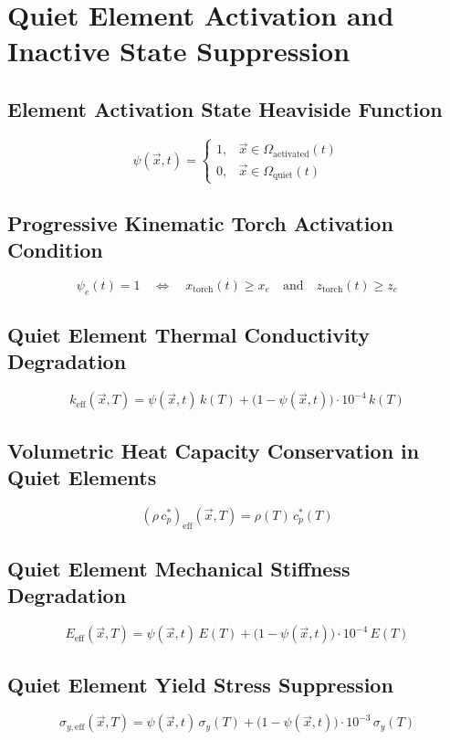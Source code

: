 \documentclass[10pt,a4paper]{article}
\begin{document}
\clearpage
\section{Quiet Element Activation and Inactive State Suppression}

\subsection*{Element Activation State Heaviside Function}
\[
\psi(\vec{x}, t) = \begin{cases}
1, & \vec{x} \in \Omega_{\mathrm{activated}}(t) \\
0, & \vec{x} \in \Omega_{\mathrm{quiet}}(t)
\end{cases}
\]

\subsection*{Progressive Kinematic Torch Activation Condition}
\[
\psi_e(t) = 1 \quad \iff \quad x_{\mathrm{torch}}(t) \ge x_e \quad \text{and} \quad z_{\mathrm{torch}}(t) \ge z_e
\]

\subsection*{Quiet Element Thermal Conductivity Degradation}
\[
k_{\mathrm{eff}}(\vec{x}, T) = \psi(\vec{x}, t)\,k(T) + \bigl(1 - \psi(\vec{x}, t)\bigr)\cdot 10^{-4}\,k(T)
\]

\subsection*{Volumetric Heat Capacity Conservation in Quiet Elements}
\[
(\rho\,c_p^*)_{\mathrm{eff}}(\vec{x}, T) = \rho(T)\,c_p^*(T)
\]

\subsection*{Quiet Element Mechanical Stiffness Degradation}
\[
E_{\mathrm{eff}}(\vec{x}, T) = \psi(\vec{x}, t)\,E(T) + \bigl(1 - \psi(\vec{x}, t)\bigr)\cdot 10^{-4}\,E(T)
\]

\subsection*{Quiet Element Yield Stress Suppression}
\[
\sigma_{y,\mathrm{eff}}(\vec{x}, T) = \psi(\vec{x}, t)\,\sigma_y(T) + \bigl(1 - \psi(\vec{x}, t)\bigr)\cdot 10^{-3}\,\sigma_y(T)
\]
\end{document}
